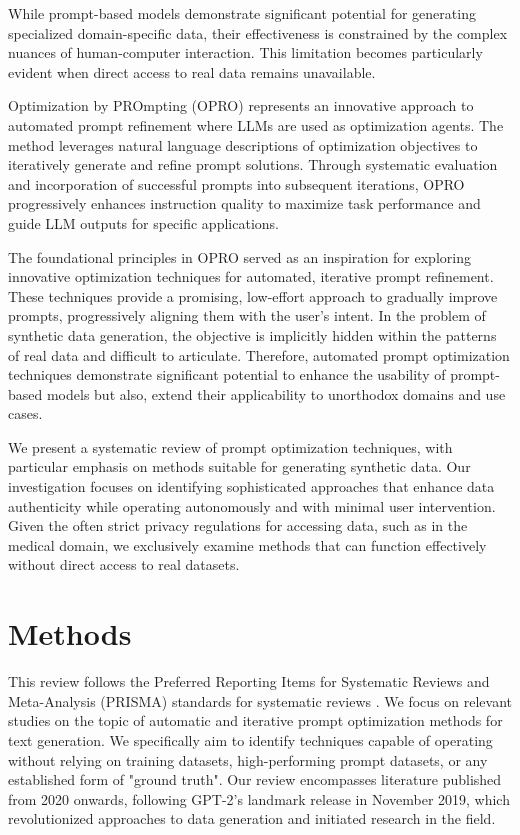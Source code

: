 \documentclass[runningheads]{llncs}
\begin{document}
While prompt-based models demonstrate significant potential for generating specialized domain-specific data, their effectiveness is constrained by the complex nuances of human-computer interaction. This limitation becomes particularly evident when direct access to real data remains unavailable. 

Optimization by PROmpting (OPRO) \cite{yang2023large} represents an innovative approach to automated prompt refinement where LLMs are used as optimization agents.
The method leverages natural language descriptions of optimization objectives to iteratively generate and refine prompt solutions. Through systematic evaluation and incorporation of successful prompts into subsequent iterations, OPRO progressively enhances instruction quality to maximize task performance and guide LLM outputs for specific applications.

The foundational principles in OPRO served as an inspiration for exploring innovative optimization techniques for automated, iterative prompt refinement. These techniques provide a promising, low-effort approach to gradually improve prompts, progressively aligning them with the user's intent. In the problem of synthetic data generation, the objective is implicitly hidden within the patterns of real data and difficult to articulate. Therefore, automated prompt optimization techniques demonstrate significant potential to enhance the usability of prompt-based models but also, extend their applicability to unorthodox domains and use cases.

We present a systematic review of prompt optimization techniques, with particular emphasis on methods suitable for generating synthetic data. Our investigation focuses on identifying sophisticated approaches that enhance data authenticity while operating autonomously and with minimal user intervention. Given the often strict privacy regulations for accessing data, such as in the medical domain, we exclusively examine methods that can function effectively without direct access to real datasets.

\section{Methods}

This review follows the Preferred Reporting Items for Systematic Reviews and Meta-Analysis (PRISMA) standards for systematic reviews \cite{liberati2009prisma}. We focus on relevant studies on the topic of automatic and iterative prompt optimization methods for text generation. We specifically aim to identify techniques capable of operating without relying on training datasets, high-performing prompt datasets, or any established form of "ground truth". Our review encompasses literature published from 2020 onwards, following GPT-2's landmark release in November 2019, which revolutionized approaches to data generation and initiated research in the field.
\end{document}
